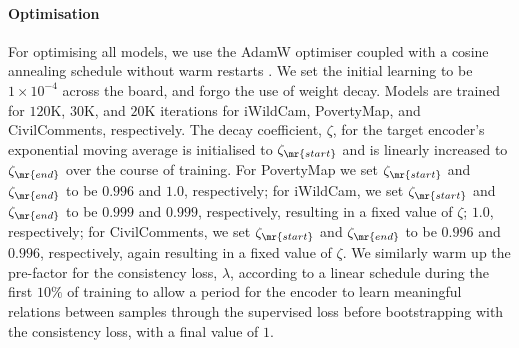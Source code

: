 \paragraph{Optimisation} For
optimising all models, we use the AdamW optimiser \citep{loshchilov2018decoupled} coupled with a
cosine annealing schedule without warm restarts \citep{DBLP:conf/iclr/LoshchilovH17}.
%
We set the initial learning to be $1 \times 10^{-4}$ across the board, and forgo the use of weight
decay. 
%
Models are trained for $120$K, $30$K, and $20$K iterations for iWildCam, PovertyMap, and
CivilComments, respectively.
%
 The decay coefficient, $\zeta$, for the target encoder's exponential moving average is initialised
 to $\zeta_{\mr{start}}$ and is linearly increased to $\zeta_{\mr{end}}$ over the course of
 training. For PovertyMap we set $\zeta_{\mr{start}}$ and $\zeta_{\mr{end}}$ to be $0.996$ and
 $1.0$, respectively;
 for iWildCam, we set $\zeta_{\mr{start}}$ and $\zeta_{\mr{end}}$ to be
 $0.999$ and $0.999$, respectively, resulting in a fixed value of $\zeta$; 
 $1.0$, respectively; 
 for CivilComments, we set $\zeta_{\mr{start}}$ and $\zeta_{\mr{end}}$ to be
 $0.996$ and $0.996$, respectively, again resulting in a fixed value of $\zeta$. 
We similarly warm up the pre-factor for the consistency loss, $\lambda$, according to a linear
schedule during the first $10\%$ of training to allow a period for the encoder to learn meaningful
relations between samples through the supervised loss before bootstrapping with the consistency
loss, with a final value of $1$.

